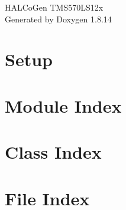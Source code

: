 \documentclass[twoside]{book}
\newcommand{\+}{\discretionary{\mbox{\scriptsize$\hookleftarrow$}}{}{}}
\newcommand{\clearemptydoublepage}{%
  \newpage{\pagestyle{empty}\cleardoublepage}%
}
\begin{document}
\hypersetup{pageanchor=false,
             bookmarksnumbered=true,
             pdfencoding=unicode
            }
\begin{titlepage}
\vspace*{7cm}
\begin{center}%
{\Large H\+A\+L\+Co\+Gen T\+M\+S570\+L\+S12x }\\
\vspace*{1cm}
{\large Generated by Doxygen 1.8.14}\\
\end{center}
\end{titlepage}
\clearemptydoublepage
{}
\tableofcontents
\clearemptydoublepage
{}
\hypersetup{pageanchor=true}

\chapter{Setup}
\label{index}\hypertarget{index}{}
\chapter{Module Index}

\chapter{Class Index}

\chapter{File Index}

\end{document}
